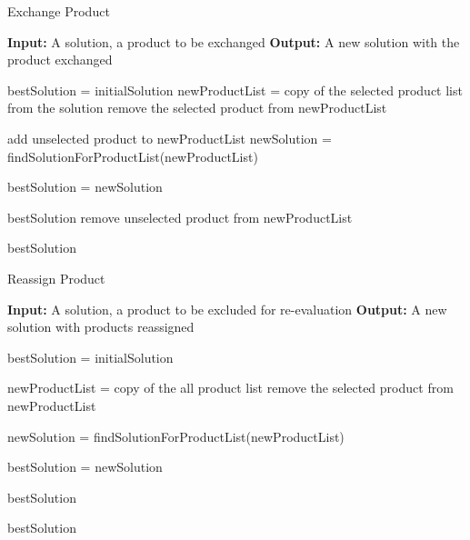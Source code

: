 \documentclass{article}
\begin{document}
\begin{algorithm}
\caption{Exchange Product}
\begin{algorithmic}
    \State \textbf{Input:} A solution, a product to be exchanged
    \State \textbf{Output:} A new solution with the product exchanged

    \State bestSolution = initialSolution
    \State newProductList = copy of the selected product list from the solution
    \State remove the selected product from newProductList

        \State add unselected product to newProductList
        \State newSolution = findSolutionForProductList(newProductList)
        
            \State bestSolution = newSolution

                \State \Return bestSolution
            \EndIf
        \EndIf
        \State remove unselected product from newProductList        
    \EndFor

    \State \Return bestSolution
\end{algorithmic}
\end{algorithm}

\begin{algorithm}
\caption{Reassign Product}
\begin{algorithmic}
    \State \textbf{Input:} A solution, a product to be excluded for re-evaluation
    \State \textbf{Output:} A new solution with products reassigned

    \State bestSolution = initialSolution
    
        \State newProductList = copy of the all product list
        \State remove the selected product from newProductList
        
        \State newSolution = findSolutionForProductList(newProductList)    

            \State bestSolution = newSolution
    
                \State \Return bestSolution
            \EndIf
        \EndIf                
    \EndFor
    
    \State \Return bestSolution
\end{algorithmic}
\end{algorithm}
\end{document}
